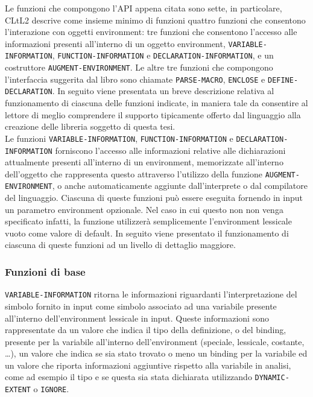 Le funzioni che compongono l’API appena citata sono sette, in particolare,
CLtL2 descrive come insieme minimo di funzioni quattro funzioni che consentono
l’interazione con oggetti environment: tre funzioni che consentono l’accesso
alle informazioni presenti all’interno di un oggetto environment, \texttt
{VARIABLE-INFORMATION}, \texttt{FUNCTION-INFORMATION} e \texttt
{DECLARATION-INFORMATION}, e un costruttore \texttt{AUGMENT-ENVIRONMENT}. Le
altre tre funzioni che compongono l’interfaccia suggerita dal libro sono
chiamate \texttt {PARSE-MACRO}, \texttt{ENCLOSE} e \texttt{DEFINE-
DECLARATION}. In seguito viene presentata un breve descrizione relativa al
funzionamento di ciascuna delle funzioni indicate, in maniera tale da
consentire al lettore di meglio comprendere il supporto tipicamente offerto
dal linguaggio alla creazione delle libreria soggetto di questa tesi.\\

Le funzioni \texttt{VARIABLE-INFORMATION}, \texttt{FUNCTION-INFORMATION} e
\texttt{DECLARATION-INFORMATION} forniscono l’accesso alle informazioni
relative alle dichiarazioni attualmente presenti all’interno di un
environment, memorizzate all’interno dell’oggetto che rappresenta questo
attraverso l’utilizzo della funzione \texttt{AUGMENT-ENVIRONMENT}, o anche
automaticamente aggiunte dall’interprete o dal compilatore del linguaggio.
Ciascuna di queste funzioni può essere eseguita fornendo in input un parametro
environment opzionale. Nel caso in cui questo non non venga specificato
infatti, la funzione utilizzerà semplicemente l’environment lessicale vuoto
come valore di default. In seguito viene presentato il funzionamento di
ciascuna di queste funzioni ad un livello di dettaglio maggiore.

\subsubsection{Funzioni di base}

\texttt{VARIABLE-INFORMATION} ritorna le informazioni riguardanti
l’interpretazione del simbolo fornito in input come simbolo associato ad una
variabile presente all’interno dell'environment lessicale in input. Queste
informazioni sono rappresentate da un valore che indica il tipo della
definizione, o del binding, presente per la variabile all’interno
dell’environment (speciale, lessicale, costante, \dots), un valore che indica
se sia stato trovato o meno un binding per la variabile ed un valore che
riporta informazioni aggiuntive rispetto alla variabile in analisi, come ad
esempio il tipo e se questa sia stata dichiarata utilizzando \texttt
{DYNAMIC-EXTENT} o \texttt{IGNORE}.\\

